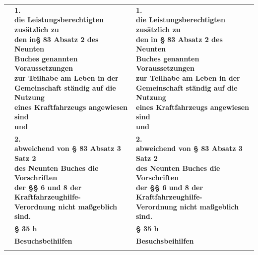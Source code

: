 \documentclass[10pt,a4paper,landscape]{article}
\begin{document}
\begin{longtable}{|L{8.2cm}|L{8.2cm}|L{8.2cm}|}
\hhline{|---|}
 & \textbf{1.   \newline die Leistungsberechtigten zusätzlich zu  \newline den }\textbf{\textcolor{diffred}{in\S{}}}\textbf{ 83 Absatz 2 des Neunten  \newline Buches genannten Voraussetzungen  \newline zur Teilhabe am Leben in der  \newline Gemeinschaft ständig auf die Nutzung  \newline eines Kraftfahrzeugs angewiesen sind  \newline und } & \textbf{1.   \newline die Leistungsberechtigten zusätzlich zu  \newline den }\textbf{\textcolor{diffgreen}{in \S{}}}\textbf{ 83 Absatz 2 des Neunten  \newline Buches genannten Voraussetzungen  \newline zur Teilhabe am Leben in der  \newline Gemeinschaft ständig auf die Nutzung  \newline eines Kraftfahrzeugs angewiesen sind  \newline und } \\
\hhline{|---|}
 & \textbf{2.   \newline abweichend von \S{} 83 Absatz 3 Satz 2  \newline des Neunten Buches die Vorschriften  \newline der \S{}\S{} 6 und 8 der Kraftfahrzeughilfe- \newline Verordnung nicht maßgeblich sind. } & \textbf{2.   \newline abweichend von \S{} 83 Absatz 3 Satz 2  \newline des Neunten Buches die Vorschriften  \newline der \S{}\S{} 6 und 8 der Kraftfahrzeughilfe- \newline Verordnung nicht maßgeblich sind. } \\
\hhline{|---|}
 & \textbf{\S{} 35 h } & \textbf{\S{} 35 h } \\
\hhline{|---|}
 & \textbf{Besuchsbeihilfen} & \textbf{Besuchsbeihilfen} \\
\hhline{|---|}

\end{longtable}
\end{document}
